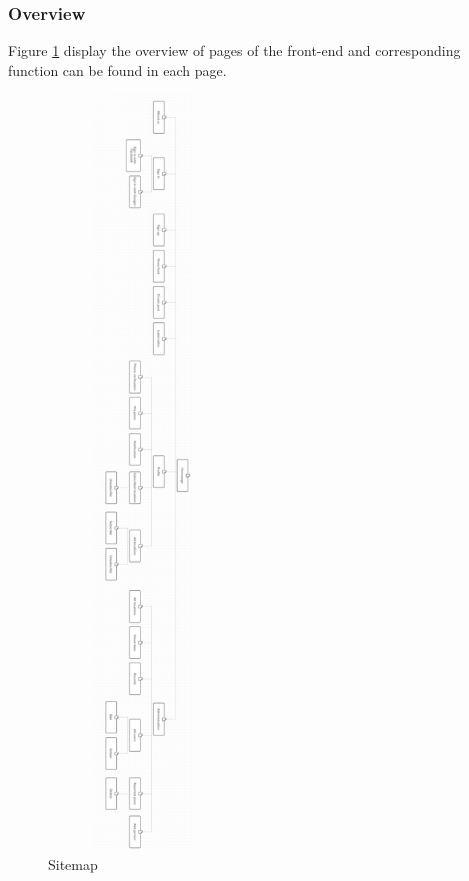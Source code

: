 \subsubsection{Overview}
Figure \ref{chap4:sitemap} display the overview of pages of the front-end and corresponding function can be found in each page.
\begin{center}
    \begin{figure}[H]
    \centering
    \includegraphics[width=5cm,height=20cm]{images/chap4/sitemap.png}
    \caption{Sitemap}
    \label{chap4:sitemap}
    \end{figure}
\end{center}
